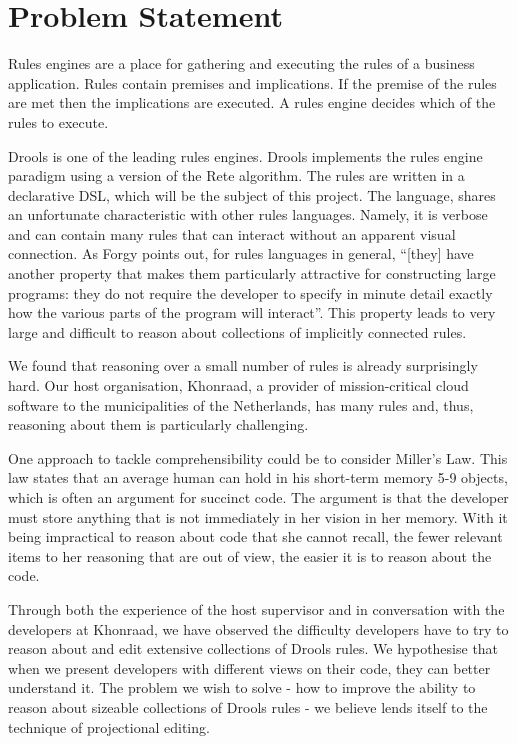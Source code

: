 \section{Problem Statement}
\label{section:problem_statement}

Rules engines are a place for gathering and executing the rules of a business application.
Rules contain premises and implications.
If the premise of the rules are met then the implications are executed.
A rules engine decides which of the rules to execute.

Drools is one of the leading rules engines.
Drools implements the rules engine paradigm using a version of the Rete algorithm.
The rules are written in a declarative DSL, which will be the subject of this project.
The language, shares an unfortunate characteristic with other rules languages.
Namely, it is verbose and can contain many rules that can interact without an apparent visual connection.
As Forgy\cite{forgy1989rete} points out, for rules languages in general, ``[they] have another property that makes them particularly attractive for constructing large programs: they do not require the developer to specify in minute detail exactly how the various parts of the program will interact''.
This property leads to very large and difficult to reason about collections of implicitly connected rules.

We found that reasoning over a small number of rules is already surprisingly hard.
Our host organisation, Khonraad, a provider of mission-critical cloud software to the municipalities of the Netherlands, has many rules and, thus, reasoning about them is particularly challenging.

One approach to tackle comprehensibility could be to consider Miller's Law\cite{miller1956magical}.
This law states that an average human can hold in his short-term memory 5-9 objects, which is often an argument for succinct code.
The argument is that the developer must store anything that is not immediately in her vision in her memory.
With it being impractical to reason about code that she cannot recall, the fewer relevant items to her reasoning that are out of view, the easier it is to reason about the code.

Through both the experience of the host supervisor and in conversation with the developers at Khonraad, we have observed the difficulty developers have to try to reason about and edit extensive collections of Drools rules.
We hypothesise that when we present developers with different views on their code, they can better understand it.
The problem we wish to solve - how to improve the ability to reason about sizeable collections of Drools rules - we believe lends itself to the technique of projectional editing.

